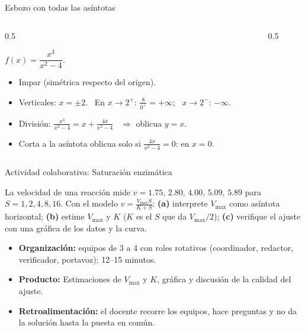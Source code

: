 \documentclass[10pt,aspectratio=169]{beamer}
\begin{document}
\begin{frame}{Esbozo con todas las asíntotas}
  \begin{columns}
    \begin{column}{0.5\textwidth}
      \begin{ejemplo}[11]
        $f(x)=\dfrac{x^3}{x^2-4}$.
        \begin{itemize}
          \item Impar (simétrica respecto del origen).
          \item Verticales: $x=\pm2$. \ En $x\to2^+$: $\frac{8}{0^+}=+\infty$; \ $x\to2^-$: $-\infty$.
          \item División: $\frac{x^3}{x^2-4}=x+\frac{4x}{x^2-4}$ \ $\Rightarrow$ oblicua $y=x$.
          \item Corta a la asíntota oblicua solo si $\frac{4x}{x^2-4}=0$: en $x=0$.
        \end{itemize}
      \end{ejemplo}
    \end{column}
    \begin{column}{0.5\textwidth}
      \centering
    \end{column}
  \end{columns}
\end{frame}

\begin{frame}{Actividad colaborativa: Saturación enzimática}
  \small
  \begin{activa}
    La velocidad de una reacción mide $v=1.75,\,2.80,\,4.00,\,5.09,\,5.89$ para $S=1,2,4,8,16$. Con el modelo $v=\frac{V_{\max}S}{K+S}$: \textbf{(a)} interprete $V_{\max}$ como asíntota horizontal; \textbf{(b)} estime $V_{\max}$ y $K$ ($K$ es el $S$ que da $V_{\max}/2$); \textbf{(c)} verifique el ajuste con una gráfica de los datos y la curva.
  \end{activa}
  \begin{itemize}
    \item \textbf{Organización:} equipos de 3 a 4 con roles rotativos (coordinador, redactor, verificador, portavoz); 12--15 minutos.
    \item \textbf{Producto:} Estimaciones de $V_{\max}$ y $K$, gráfica y discusión de la calidad del ajuste.
    \item \textbf{Retroalimentación:} el docente recorre los equipos, hace preguntas y no da la solución hasta la puesta en común.
  \end{itemize}
\end{frame}
\end{document}
